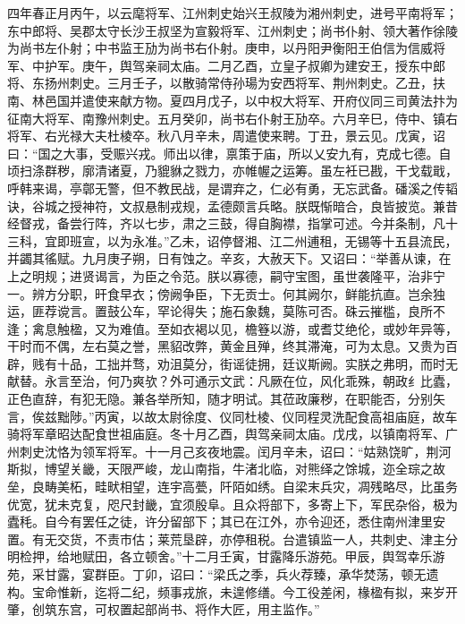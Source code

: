 \documentclass[]{article}
\begin{document}
四年春正月丙午，以云麾将军、江州刺史始兴王叔陵为湘州刺史，进号平南将军；东中郎将、吴郡太守长沙王叔坚为宣毅将军、江州刺史；尚书仆射、领大著作徐陵为尚书左仆射；中书监王劢为尚书右仆射。庚申，以丹阳尹衡阳王伯信为信威将军、中护军。庚午，舆驾亲祠太庙。二月乙酉，立皇子叔卿为建安王，授东中郎将、东扬州刺史。三月壬子，以散骑常侍孙瑒为安西将军、荆州刺史。乙丑，扶南、林邑国并遣使来献方物。夏四月戊子，以中权大将军、开府仪同三司黄法抃为征南大将军、南豫州刺史。五月癸卯，尚书右仆射王劢卒。六月辛巳，侍中、镇右将军、右光禄大夫杜棱卒。秋八月辛未，周遣使来聘。丁丑，景云见。戊寅，诏曰：``国之大事，受赈兴戎。师出以律，禀策于庙，所以乂安九有，克成七德。自顷扫涤群秽，廓清诸夏，乃貔貅之戮力，亦帷幄之运筹。虽左衽已戡，干戈载戢，呼韩来谒，亭鄣无警，但不教民战，是谓弃之，仁必有勇，无忘武备。磻溪之传韬诀，谷城之授神符，文叔悬制戎规，孟德颇言兵略。朕既惭暗合，良皆披览。兼昔经督戎，备尝行阵，齐以七步，肃之三鼓，得自胸襟，指掌可述。今并条制，凡十三科，宜即班宣，以为永准。''乙未，诏停督湘、江二州逋租，无锡等十五县流民，并蠲其徭赋。九月庚子朔，日有蚀之。辛亥，大赦天下。又诏曰：``举善从谏，在上之明规；进贤谒言，为臣之令范。朕以寡德，嗣守宝图，虽世袭隆平，治非宁一。辨方分职，旰食早衣；傍阙争臣，下无贡士。何其阙尔，鲜能抗直。岂余独运，匪荐谠言。置鼓公车，罕论得失；施石象魏，莫陈可否。硃云摧槛，良所不逢；禽息触楹，又为难值。至如衣褐以见，檐簦以游，或耆艾绝伦，或妙年异等，干时而不偶，左右莫之誉，黑貂改弊，黄金且殚，终其滞淹，可为太息。又贵为百辟，贱有十品，工拙并骛，劝沮莫分，街谣徒拥，廷议斯阙。实朕之弗明，而时无献替。永言至治，何乃爽欤？外可通示文武：凡厥在位，风化乖殊，朝政纟比蠹，正色直辞，有犯无隐。兼各举所知，随才明试。其莅政廉秽，在职能否，分别矢言，俟兹黜陟。''丙寅，以故太尉徐度、仪同杜棱、仪同程灵洗配食高祖庙庭，故车骑将军章昭达配食世祖庙庭。冬十月乙酉，舆驾亲祠太庙。戊戌，以镇南将军、广州刺史沈恪为领军将军。十一月己亥夜地震。闰月辛未，诏曰：``姑熟饶旷，荆河斯拟，博望关畿，天限严峻，龙山南指，牛渚北临，对熊绎之馀城，迩全琮之故垒，良畴美柘，畦畎相望，连宇高甍，阡陌如绣。自梁末兵灾，凋残略尽，比虽务优宽，犹未克复，咫尺封畿，宜须殷阜。且众将部下，多寄上下，军民杂俗，极为蠹秏。自今有罢任之徒，许分留部下；其已在江外，亦令迎还，悉住南州津里安置。有无交货，不责市估；莱荒垦辟，亦停租税。台遣镇监一人，共刺史、津主分明检押，给地赋田，各立顿舍。''十二月壬寅，甘露降乐游苑。甲辰，舆驾幸乐游苑，采甘露，宴群臣。丁卯，诏曰：``梁氏之季，兵火荐臻，承华焚荡，顿无遗构。宝命惟新，迄将二纪，频事戎旅，未遑修缮。今工役差闲，椽楹有拟，来岁开肇，创筑东宫，可权置起部尚书、将作大匠，用主监作。''
\end{document}
